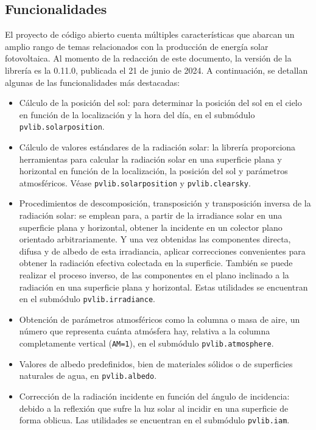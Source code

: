 \subsection{Funcionalidades} \label{ssct:pvlib:funcionalidades}

El proyecto de código abierto \pvlibpy{} cuenta múltiples características que abarcan un amplio rango de temas relacionados con la producción de energía solar fotovoltaica. Al momento de la redacción de este documento, la versión de la librería es la 0.11.0, publicada el 21 de junio de 2024. A continuación, se detallan algunas de las funcionalidades más destacadas:

\begin{itemize}
    \item Cálculo de la posición del sol: para determinar la posición del sol en el cielo en función de la localización y la hora del día, en el submódulo \texttt{pvlib.solarposition}.
    \item Cálculo de valores estándares de la radiación solar: la librería proporciona herramientas para calcular la radiación solar en una superficie plana y horizontal en función de la localización, la posición del sol y parámetros atmosféricos. Véase \texttt{pvlib.solarposition} y \texttt{pvlib.clearsky}.
    \item Procedimientos de descomposición, transposición y transposición inversa de la radiación solar: se emplean para, a partir de la irradiance solar en una superficie plana y horizontal, obtener la incidente en un colector plano orientado arbitrariamente. Y una vez obtenidas las componentes directa, difusa y de albedo de esta irradiancia, aplicar correcciones convenientes para obtener la radiación efectiva colectada en la superficie. También se puede realizar el proceso inverso, de las componentes en el plano inclinado a la radiación en una superficie plana y horizontal. Estas utilidades se encuentran en el submódulo \texttt{pvlib.irradiance}.
    \item Obtención de parámetros atmosféricos como la columna o masa de aire, un número que representa cuánta atmósfera hay, relativa a la columna completamente vertical (\texttt{AM=1}), en el submódulo \texttt{pvlib.atmosphere}.
    \item Valores de albedo predefinidos, bien de materiales sólidos o de superficies naturales de agua, en \texttt{pvlib.albedo}.
    \item Corrección de la radiación incidente en función del ángulo de incidencia: debido a la reflexión que sufre la luz solar al incidir en una superficie de forma oblicua. Las utilidades se encuentran en el submódulo \texttt{pvlib.iam}.

\end{itemize}
